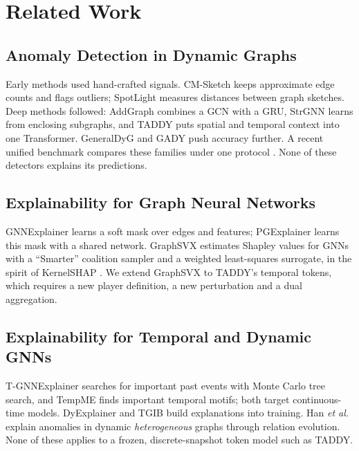 \documentclass[conference]{IEEEtran}
\begin{document}
\section{Related Work}
\label{sec:related}

\subsection{Anomaly Detection in Dynamic Graphs}
Early methods used hand-crafted signals. CM-Sketch \cite{ranshous2016scalable}
keeps approximate edge counts and flags outliers; SpotLight
\cite{eswaran2018spotlight} measures distances between graph sketches. Deep
methods followed: AddGraph \cite{zheng2019addgraph} combines a GCN with a GRU,
StrGNN \cite{cai2021strgnn} learns from enclosing subgraphs, and TADDY
\cite{liu2021taddy} puts spatial and temporal context into one Transformer.
GeneralDyG \cite{yang2025generaldyg} and GADY \cite{lou2023gady} push accuracy
further. A recent unified benchmark compares these families under one protocol
\cite{nekka2026survey}. None of these detectors explains its predictions.

\subsection{Explainability for Graph Neural Networks}
GNNExplainer \cite{ying2019gnnexplainer} learns a soft mask over edges and
features; PGExplainer \cite{luo2020pgexplainer} learns this mask with a shared
network. GraphSVX \cite{duval2021graphsvx} estimates Shapley values for GNNs
with a ``Smarter'' coalition sampler and a weighted least-squares surrogate, in
the spirit of KernelSHAP \cite{lundberg2017shap}. We extend GraphSVX to TADDY's
temporal tokens, which requires a new player definition, a new perturbation and
a dual aggregation.

\subsection{Explainability for Temporal and Dynamic GNNs}
T-GNNExplainer \cite{xia2023tgnnexplainer} searches for important past events
with Monte Carlo tree search, and TempME \cite{chen2023tempme} finds important
temporal motifs; both target continuous-time models. DyExplainer
\cite{wang2023dyexplainer} and TGIB \cite{seo2024tgib} build explanations into
training. Han \emph{et al.} \cite{han2026explainable} explain anomalies in
dynamic \emph{heterogeneous} graphs through relation evolution. None of these
applies to a frozen, discrete-snapshot token model such as TADDY.
\end{document}
